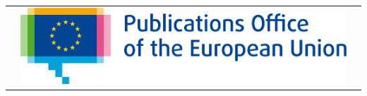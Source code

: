 \begin{titlepage}
\begin{center}

\begin{center}
	\begin{center}
		\setlength{\tabcolsep}{0pt}
        \begin{tabular}{>{\raggedleft}m{3.5cm}>{\centering}m{\dimexpr\textwidth - 8cm\relax}>{\raggedright}m{3.5cm}}
        			&%
					\includegraphics[width=1.5\linewidth]{images/logos/EU-OP.png}	
					&%
		\end{tabular}
    \end{center}




  \vspace{2mm}

\end{center}
  \vspace{5cm}
  \textbf{{\large \DelInitiative\\}}
  \vspace{2cm}
  
  \begin{spacing}{2.5}
    \textbf{\Huge \DelTitle}\\ \vspace{2cm}
  \end{spacing}
  
  
  
  \vspace*{\fill}  
   
  

\end{center}
\end{titlepage}


